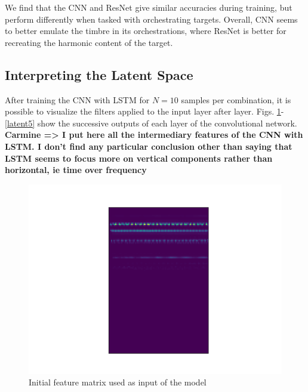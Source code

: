 \documentclass{article}
\newcommand{\carmine}[1]{\textbf{\color{red} Carmine => #1}}
\begin{document}
We find that the CNN and ResNet give similar accuracies during training, but perform differently when tasked with orchestrating targets. Overall, CNN seems to better emulate the timbre in its orchestrations, where ResNet is better for recreating the harmonic content of the target. 

\subsection{Interpreting the Latent Space}

After training the CNN with LSTM for $N=10$ samples per combination, it is possible to visualize the filters applied to the input layer after layer. Figs. \ref{latent0}-\ref{latent5} show the successive outputs of each layer of the convolutional network. \carmine{I put here all the intermediary features of the CNN with LSTM. I don't find any particular conclusion other than saying that LSTM seems to focus more on vertical components rather than horizontal, ie time over frequency}

\begin{figure}
\includegraphics[scale=0.5]{figs/latent_space_layer0.png}
\caption{Initial feature matrix used as input of the model \label{latent0}}
\end{figure}
\end{document}
